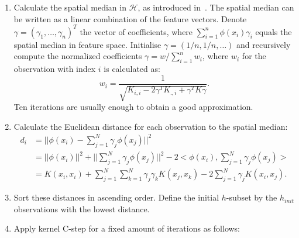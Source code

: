 \documentclass[preprint,12pt]{elsarticle}
\begin{document}
	\begin{enumerate}
		\item Calculate the spatial median in $\mathcal{H}$, as introduced in~\cite{debruyne2010detecting}. The spatial median can be written as a linear combination of the feature vectors. Denote $\gamma = (\gamma_1, \dots, \gamma_n)^T$ the vector of coefficients, where  $\sum_{i=1}^{n} \phi(x_i) \gamma_i$ equals the spatial median in feature space. Initialise $\gamma = (1/n, 1/n, \dots)$ and recursively compute the normalized coefficients $\gamma = w / \sum_{i=1}^{n}w_i$, where $w_i$ for the observation with index $i$ is calculated as:
		\begin{equation}
		w_i = \frac{1}{\sqrt{ K_{i,i} - 2 \gamma^T K_{., i} + \gamma^T K \gamma}}.
		\end{equation}
		Ten iterations are usually enough to obtain a good approximation.	
		\item  Calculate the Euclidean distance for each observation to the spatial median:
		\begin{align}
		d_i &= || \phi(x_i) - \sum_{j=1}^N \gamma_j \phi(x_j)||^2 \\
		&= || \phi(x_i)||^2 + || \sum_{j=1}^N \gamma_j \phi(x_j)||^2 - 2 <\phi(x_i),\sum_{j=1}^N \gamma_j \phi(x_j)> \\
		&= K(x_i,x_i) + \sum_{j=1}^N \sum_{k=1}^N \gamma_j \gamma_k K(x_j,x_k) - 2 \sum_{j=1}^N\gamma_j K(x_i,x_j).
		\end{align}
		\item 	Sort these distances in ascending order. Define the initial $h$-subset by the $h_{init}$ observations with the lowest distance.	
		
		\item Apply kernel C-step for a fixed amount of iterations as follows:
		

\end{enumerate}
\end{document}
